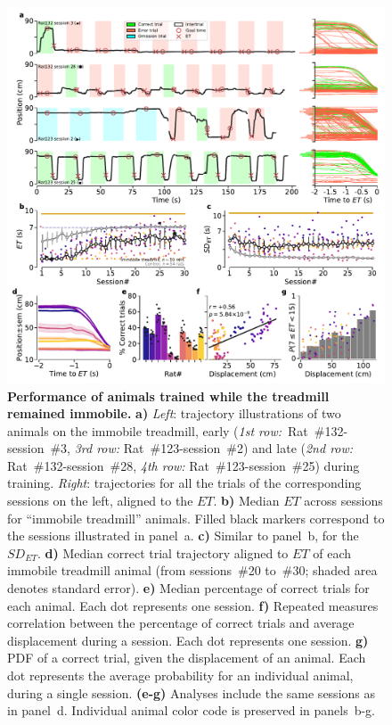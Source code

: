 \begin{figure}[!bt]
  \begin{center}
    \includegraphics[width=\textwidth]{ch-time/figures/ImmTrd.pdf}
    \caption[Immobile Condition]
    {\textbf{Performance of animals trained while the treadmill remained immobile.}
    \textbf{a)}
    \textit{Left}: trajectory illustrations of two animals on the immobile treadmill, early (\textit{1st row:}~Rat~\#132-session~\#3, \textit{3rd row:} Rat~\#123-session~\#2) and late (\textit{2nd row:} Rat~\#132-session~\#28, \textit{4th row:} Rat~\#123-session~\#25) during training.
    \textit{Right}: trajectories for all the trials of the corresponding sessions on the left, aligned to the $ET$.
    \textbf{b)}
    Median $ET$ across sessions for ``immobile treadmill'' animals.
    Filled black markers correspond to the sessions illustrated in panel~a.
    \textbf{c)}
    Similar to panel~b, for the $SD_{ET}$.
    \textbf{d)}
    Median correct trial trajectory aligned to $ET$ of each immobile treadmill animal (from sessions~\#20 to~\#30; shaded area denotes standard error).
    \textbf{e)}
    Median percentage of correct trials for each animal.
    Each dot represents one session.
    \textbf{f)}
    Repeated measures correlation between the percentage of correct trials and average displacement during a session.
    Each dot represents one session.
    \textbf{g)}
    PDF of a correct trial, given the displacement of an animal.
    Each dot represents the average probability for an individual animal, during a single session.
    \textbf{(e-g)}
    Analyses include the same sessions as in panel~d.
    Individual animal color code is preserved in panels~b-g.
    }
    \label{fig:time:ImmTrd}
  \end{center}
\end{figure}